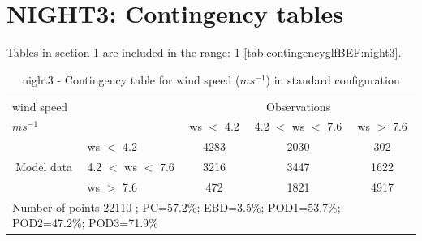 \section{NIGHT3: Contingency tables}\label{sec:night3:cont}
Tables in section \ref{sec:night3:cont} are included in the range: \ref{tab:contingencywsBEF:night3}-\ref{tab:contingencyglfBEF:night3}.
\begin{table}[h!]
\begin{center}
\begin{tabular}{llccc}
\hline
{wind speed}                                       &                                                    & \multicolumn{3}{c}{Observations}                 \\
{$m s^{-1}$}                                       &                             & ws $<$ 4.2   & 4.2 $<$ ws $<$ 7.6 & ws $>$ 7.6 \\
\hline
\multicolumn{1}{c}{\multirow{3}{*}{Model data}}  & ws $<$ 4.2             & 4283                & 2030                       & 302              \\
                                                 & 4.2  $<$ ws $<$ 7.6 & 3216                & 3447                       & 1622              \\
                                                 & ws $>$ 7.6             & 472                & 1821                       & 4917              \\
\hline 
\multicolumn{5}{l}{ Number of points        22110 ; PC=57.2\%; EBD=3.5\%; POD1=53.7\%; POD2=47.2\%; POD3=71.9\%}                 \\
\end{tabular}
\end{center}
\caption{night3 - Contingency table for {wind speed} ($m s^{-1}$) in standard configuration}
\label{tab:contingencywsBEF:night3}
\end{table}
